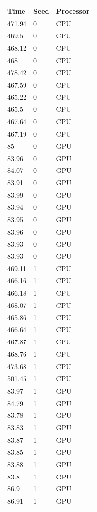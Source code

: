 \begin{table}
\caption{CPU vs GPU Total Runtime Seeds 0 and 1}
\centering
 \begin{longtable}{ | l | l | l |}
    \hline
    Time & Seed & Processor \\ \hline
    471.94 & 0 & CPU \\ \hline
    469.5 & 0 & CPU \\ \hline
    468.12 & 0 & CPU \\ \hline
    468 & 0 & CPU \\ \hline
    478.42 & 0 & CPU \\ \hline
    467.59 & 0 & CPU \\ \hline
    465.22 & 0 & CPU \\ \hline
    465.5 & 0 & CPU \\ \hline
    467.64 & 0 & CPU \\ \hline
    467.19 & 0 & CPU \\ \hline
    85 & 0 & GPU \\ \hline
    83.96 & 0 & GPU \\ \hline
    84.07 & 0 & GPU \\ \hline
    83.91 & 0 & GPU \\ \hline
    83.99 & 0 & GPU \\ \hline
    83.94 & 0 & GPU \\ \hline
    83.95 & 0 & GPU \\ \hline
    83.96 & 0 & GPU \\ \hline
    83.93 & 0 & GPU \\ \hline
    83.93 & 0 & GPU \\ \hline
    469.11 & 1 & CPU \\ \hline
    466.16 & 1 & CPU \\ \hline
    466.18 & 1 & CPU \\ \hline
    468.07 & 1 & CPU \\ \hline
    465.86 & 1 & CPU \\ \hline
    466.64 & 1 & CPU \\ \hline
    467.87 & 1 & CPU \\ \hline
    468.76 & 1 & CPU \\ \hline
    473.68 & 1 & CPU \\ \hline
    501.45 & 1 & CPU \\ \hline
    83.97 & 1 & GPU \\ \hline
    84.79 & 1 & GPU \\ \hline
    83.78 & 1 & GPU \\ \hline
    83.83 & 1 & GPU \\ \hline
    83.87 & 1 & GPU \\ \hline
    83.85 & 1 & GPU \\ \hline
    83.88 & 1 & GPU \\ \hline
    83.8 & 1 & GPU \\ \hline
    86.9 & 1 & GPU \\ \hline
    86.91 & 1 & GPU \\ \hline
    \end{longtable}
\label{table:CPU vs GPU total runtime}
\end{table}
\bigskip

